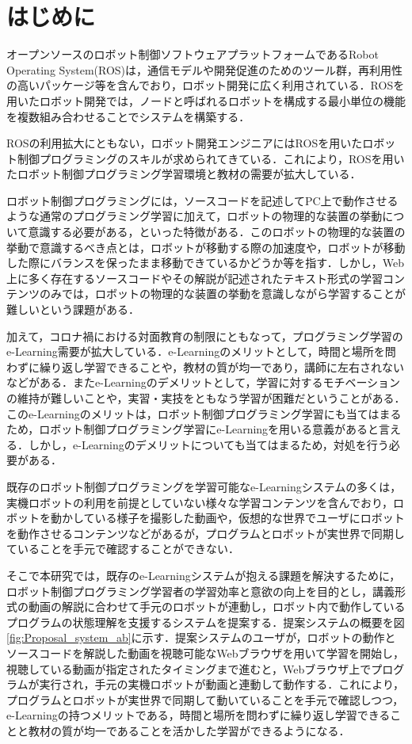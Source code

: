 \documentclass{ujarticle}
\begin{document}
\section{はじめに}%
オープンソースのロボット制御ソフトウェアプラットフォームであるRobot Operating System(ROS)は，通信モデルや開発促進のためのツール群，再利用性の高いパッケージ等を含んでおり，ロボット開発に広く利用されている．ROSを用いたロボット開発では，ノードと呼ばれるロボットを構成する最小単位の機能を複数組み合わせることでシステムを構築する．
\par ROSの利用拡大にともない，ロボット開発エンジニアにはROSを用いたロボット制御プログラミングのスキルが求められてきている．これにより，ROSを用いたロボット制御プログラミング学習環境と教材の需要が拡大している．
\par ロボット制御プログラミングには，ソースコードを記述してPC上で動作させるような通常のプログラミング学習に加えて，ロボットの物理的な装置の挙動について意識する必要がある，といった特徴がある．このロボットの物理的な装置の挙動で意識するべき点とは，ロボットが移動する際の加速度や，ロボットが移動した際にバランスを保ったまま移動できているかどうか等を指す．しかし，Web上に多く存在するソースコードやその解説が記述されたテキスト形式の学習コンテンツのみでは，ロボットの物理的な装置の挙動を意識しながら学習することが難しいという課題がある．
\par 加えて，コロナ禍における対面教育の制限にともなって，プログラミング学習のe-Learning需要が拡大している．e-Learningのメリットとして，時間と場所を問わずに繰り返し学習できることや，教材の質が均一であり，講師に左右されないなどがある．またe-Learningのデメリットとして，学習に対するモチベーションの維持が難しいことや，実習・実技をともなう学習が困難だということがある．このe-Learningのメリットは，ロボット制御プログラミング学習にも当てはまるため，ロボット制御プログラミング学習にe-Learningを用いる意義があると言える．しかし，e-Learningのデメリットについても当てはまるため，対処を行う必要がある．
\par 既存のロボット制御プログラミングを学習可能なe-Learningシステムの多くは，実機ロボットの利用を前提としていない様々な学習コンテンツを含んでおり，ロボットを動かしている様子を撮影した動画や，仮想的な世界でユーザにロボットを動作させるコンテンツなどがあるが，プログラムとロボットが実世界で同期していることを手元で確認することができない．
\par そこで本研究では，既存のe-Learningシステムが抱える課題を解決するために，ロボット制御プログラミング学習者の学習効率と意欲の向上を目的とし，講義形式の動画の解説に合わせて手元のロボットが連動し，ロボット内で動作しているプログラムの状態理解を支援するシステムを提案する．提案システムの概要を図\ref{fig:Proposal_system_ab}に示す．提案システムのユーザが，ロボットの動作とソースコードを解説した動画を視聴可能なWebブラウザを用いて学習を開始し，視聴している動画が指定されたタイミングまで進むと，Webブラウザ上でプログラムが実行され，手元の実機ロボットが動画と連動して動作する．これにより，プログラムとロボットが実世界で同期して動いていることを手元で確認しつつ，e-Learningの持つメリットである，時間と場所を問わずに繰り返し学習できることと教材の質が均一であることを活かした学習ができるようになる．
\end{document}
